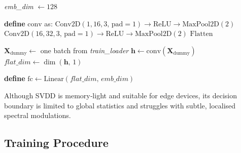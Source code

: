\begin{algorithm}[H]
\caption{SVDDNet\,—\,Convolutional Encoder for Deep-SVDD}

\DontPrintSemicolon

\textit{emb\_dim} $\leftarrow 128$\;

\vspace{0.3em}
\textbf{define} $\mathrm{conv}$ as:\;
\Indp
$\mathrm{Conv2D}(1,16,3,\,\text{pad}=1)\!\rightarrow\!\mathrm{ReLU}\!\rightarrow\!\mathrm{MaxPool2D}(2)$\;
$\mathrm{Conv2D}(16,32,3,\,\text{pad}=1)\!\rightarrow\!\mathrm{ReLU}\!\rightarrow\!\mathrm{MaxPool2D}(2)$\;
$\mathrm{Flatten}$\;
\Indm

\BlankLine
$\mathbf X_{\text{dummy}} \leftarrow$ one batch from \textit{train\_loader}\;
$\mathbf h \leftarrow \mathrm{conv}(\mathbf X_{\text{dummy}})$\;
$\textit{flat\_dim} \leftarrow \operatorname{dim}(\mathbf h,\,1)$\;

\BlankLine
\textbf{define} $\mathrm{fc} \leftarrow \mathrm{Linear}(\textit{flat\_dim},\,\textit{emb\_dim})$\;

\BlankLine

\end{algorithm}

Although SVDD is memory‑light and suitable for edge devices, its decision boundary is limited to global statistics and struggles with subtle, localised spectral modulations.

\subsection{Training Procedure}
\label{subsec:Training Procedure}


